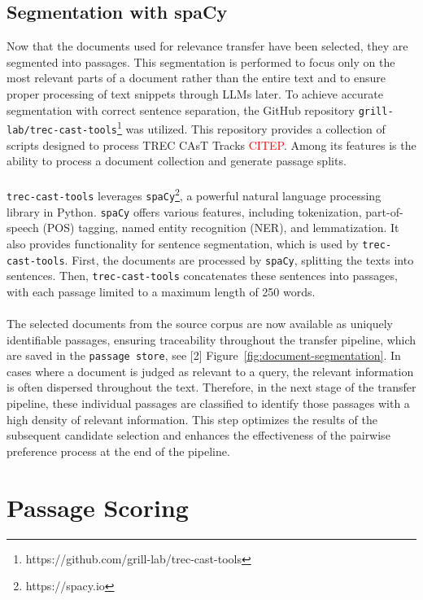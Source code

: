 \subsection{Segmentation with spaCy}\label{segmentation-with-spacy}

Now that the documents used for relevance transfer have been selected, they are segmented into passages. This segmentation is performed to focus only on the most relevant parts of a document rather than the entire text and to ensure proper processing of text snippets through LLMs later. To achieve accurate segmentation with correct sentence separation, the GitHub repository \texttt{grill-lab/trec-cast-tools}\footnote{https://github.com/grill-lab/trec-cast-tools} was utilized. This repository provides a collection of scripts designed to process TREC CAsT Tracks \textcolor{red}{CITEP}. Among its features is the ability to process a document collection and generate passage splits.
\\\\
\texttt{trec-cast-tools} leverages \texttt{spaCy}\footnote{https://spacy.io}, a powerful natural language processing library in Python. \texttt{spaCy} offers various features, including tokenization, part-of-speech (POS) tagging, named entity recognition (NER), and lemmatization. It also provides functionality for sentence segmentation, which is used by \texttt{trec-cast-tools}. First, the documents are processed by \texttt{spaCy}, splitting the texts into sentences. Then, \texttt{trec-cast-tools} concatenates these sentences into passages, with each passage limited to a maximum length of 250 words.
\\\\
The selected documents from the source corpus are now available as uniquely identifiable passages, ensuring traceability throughout the transfer pipeline, which are saved in the \texttt{passage store}, see [2] Figure~\ref{fig:document-segmentation}. In cases where a document is judged as relevant to a query, the relevant information is often dispersed throughout the text. Therefore, in the next stage of the transfer pipeline, these individual passages are classified to identify those passages with a high density of relevant information. This step optimizes the results of the subsequent candidate selection and enhances the effectiveness of the pairwise preference process at the end of the pipeline.
\pagebreak


\section{Passage Scoring}\label{passage-scoring}

